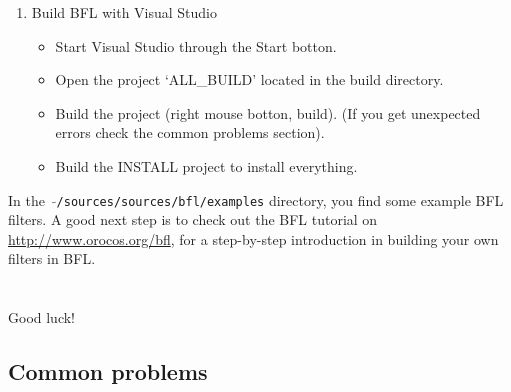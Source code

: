 \documentclass[a4paper,10pt]{article}
\begin{document}
\begin{enumerate}
\begin{itemize}
	 \item Fill in:
		\begin{itemize}
		\item CMAKE\_BUILD\_TYPE: release
		\item CMAKE\_INSTALL\_PREFIX: $ c:\backslash Users \backslash username \backslash Desktop \backslash orocos-bfl-0.6.0-pre1-src \backslash build$
		\item LIBRARY\_TYPE: static
		\item MATRIX\_INSTALL: $ c:\backslash boost \backslash$
		\item MATRIX\_LIB: boost
		\item RNG\_INSTALL: $ c:\backslash boost \backslash$
		\item RNG\_LIB: boost
		\end{itemize}
	\item Press the Configure botton until you can press OK.
	\item Press OK. CMake will shut down now, and BFL is ready to build. (If you get unexpected errors check the common problems section \ref{subsec:problems}).
	\end{itemize}
\item Build BFL with Visual Studio
	\begin{itemize}
	\item Start Visual Studio through the Start botton.
	\item Open the project `ALL\_BUILD' located in the build directory.
	\item Build the project (right mouse botton, build). (If you get unexpected errors check the common problems section).
	\item Build the INSTALL project to install everything.
	\end{itemize}
\end{enumerate}

In the \ $\mathtt{\tilde{ }}$\texttt{/sources/sources/bfl/examples} directory, you find some example BFL
filters. A good next step is to check out the BFL tutorial on
\url{http://www.orocos.org/bfl}, for a step-by-step introduction in building
your own filters in BFL.
\\\\\\
Good luck!

\subsection{Common problems}
\label{subsec:problems}
\end{document}
